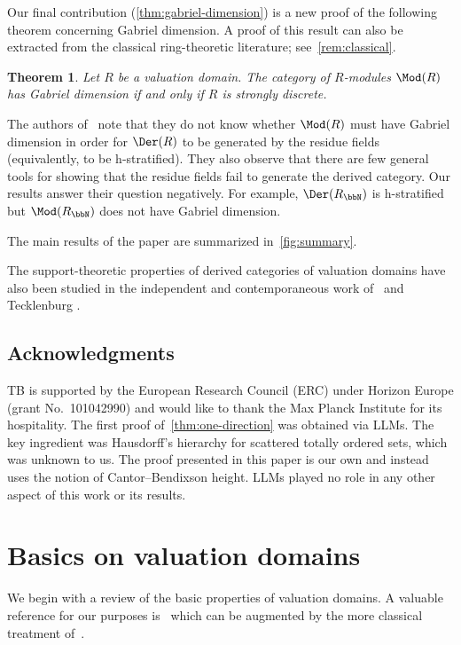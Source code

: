 \documentclass{amsart}
\numberwithin{equation}{section}%
\newtheorem{Thm}[equation]{Theorem}
\theoremstyle{remark}
\begin{document}
Our final contribution (\cref{thm:gabriel-dimension}) is a new proof of the following theorem concerning Gabriel dimension. A proof of this result can also be extracted from the classical ring-theoretic literature; see~\cref{rem:classical}.

\begin{Thm}\label{thm:main-gabriel-dimension}
	Let $R$ be a valuation domain. The category of $R$-modules $\Mod(R)$ has Gabriel dimension if and only if $R$ is strongly discrete.
\end{Thm}

The authors of~\cite{BalchinGomezStevenson26pp} note that they do not know whether $\Mod(R)$ must have Gabriel dimension in order for $\Der(R)$ to be generated by the residue fields (equivalently, to be h-stratified). They also observe that there are few general tools for showing that the residue fields fail to generate the derived category. Our results answer their question negatively. For example, $\Der(R_\bbN)$ is h-stratified but $\Mod(R_\bbN)$ does not have Gabriel dimension.

\medskip
The main results of the paper are summarized in~\cref{fig:summary}.

\medskip
The support-theoretic properties of derived categories of valuation domains have also been studied in the independent and contemporaneous work of \Stovicek~and Tecklenburg \cite{StovicekTecklenburg2026pp}.

\subsection*{Acknowledgments}
TB is supported by the European Research Council (ERC) under Horizon Europe (grant No.~101042990) and would like to thank the Max Planck Institute for its hospitality. 
The first proof of~\cref{thm:one-direction} was obtained via LLMs. The key ingredient was Hausdorff's hierarchy for scattered totally ordered sets, which was unknown to us. The proof presented in this paper is our own and instead uses the notion of Cantor--Bendixson height. LLMs played no role in any other aspect of this work or its results.


\section{Basics on valuation domains}

We begin with a review of the basic properties of valuation domains. A valuable reference for our purposes is~\cite{FuchsSalce01} which can be augmented by the more classical treatment of~\cite{Gilmer92}.
\end{document}
